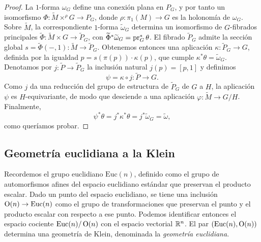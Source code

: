 \documentclass[11pt,a4paper]{amsbook}
\theoremstyle{remark} \newtheorem{rmk}[subsection]{Observación}
\theoremstyle{definition} \newtheorem{defn}[subsection]{Definición}
\theoremstyle{definition} \newtheorem{ex}[subsection]{Ejemplo}
\theoremstyle{definition} \newtheorem{ej}[subsection]{Ejercicio}
\begin{document}
\begin{proof}
  La $1$-forma $\omega_G$ define una conexión plana en $P_G$, y por tanto un isomorfismo $\Phi:\widetilde{M}\times^\rho G \rightarrow P_G$, donde $\rho:\pi_1(M)\rightarrow G$ es la holonomía de $\omega_G$. Sobre $\widetilde{M}$, la correspondiente $1$-forma $\widetilde{\omega}_G$ determina un isomorfismo de $G$-fibrados principales $\widetilde{\Phi}: \widetilde{M}\times G \rightarrow \widetilde{P}_G$, con $\widetilde{\Phi}^* \widetilde{\omega}_G = \operatorname{pr}_G^* \theta$. El fibrado $\widetilde{P}_G$ admite la sección global $s=\widetilde{\Phi}(-,1):\widetilde{M}\rightarrow \widetilde{P}_G$. Obtenemos entonces una aplicación $\kappa: \widetilde{P}_G \rightarrow G$, definida por la igualdad $p=s(\pi(p))\cdot \kappa(p)$, que cumple $\kappa^* \theta = \widetilde{\omega}_G$. Denotamos por $j:\widetilde{P}\rightarrow \widetilde{P}_G$ la inclusión natural $j(p)=[p,1]$ y definimos
  \begin{equation*}
\psi = \kappa \circ j: \widetilde{P} \rightarrow G.
  \end{equation*}
  Como $j$ da una reducción del grupo de estructura de $\widetilde{P}_G$ de $G$ a $H$, la aplicación $\psi$ es $H$-equivariante, de modo que desciende a una aplicación $\varphi:\widetilde{M}\rightarrow G/H$.
  Finalmente,
  \begin{equation*}
\psi^* \theta = j^* \kappa^* \theta = j^* \widetilde{\omega}_G = \tilde{\omega},
  \end{equation*}
como queríamos probar.
\end{proof}

\subsection{Geometría euclidiana a la Klein} Recordemos el grupo euclidiano $\mathrm{Euc}(n)$, definido como el grupo de automorfismos afines del espacio euclidiano estándar que preservan el producto escalar. Dado un punto del espacio euclidiano, se tiene una inclusión $\operatorname{O}(n)\rightarrow \mathrm{Euc}(n)$ como el grupo de transformaciones que preservan el punto y el producto escalar con respecto a ese punto. Podemos identificar entonces el espacio cociente $\mathrm{Euc}(n)/\operatorname{O}(n)$ con el espacio vectorial $\mathbb R^n$. El par $(\mathrm{Euc}(n),\operatorname{O}(n))$ determina una geometría de Klein, denominada la \emph{geometría euclidiana}.
\end{document}
